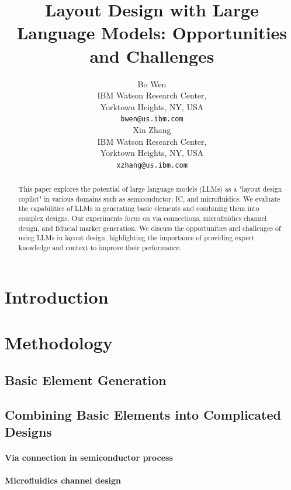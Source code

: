 \documentclass{article}
\title{Layout Design with Large Language Models: Opportunities and Challenges}
\author{%
  Bo Wen\\
  IBM Watson Research Center, \\
  Yorktown Heights, NY, USA \\
  \texttt{bwen@us.ibm.com} \\
  \And
  Xin Zhang\\
  IBM Watson Research Center, \\
  Yorktown Heights, NY, USA \\
  \texttt{xzhang@us.ibm.com} \\
}
\begin{document}
\maketitle

\begin{abstract}
  This paper explores the potential of large language models (LLMs) as a "layout design copilot" in various domains such as semiconductor, IC, and microfluidics. We evaluate the capabilities of LLMs in generating basic elements and combining them into complex designs. Our experiments focus on via connections, microfluidics channel design, and fiducial marker generation. We discuss the opportunities and challenges of using LLMs in layout design, highlighting the importance of providing expert knowledge and context to improve their performance.
\end{abstract}

\section{Introduction}

\section{Methodology}
\subsection{Basic Element Generation}

\subsection{Combining Basic Elements into Complicated Designs}
\paragraph{Via connection in semiconductor process}
\paragraph{Microfluidics channel design}
\end{document}
